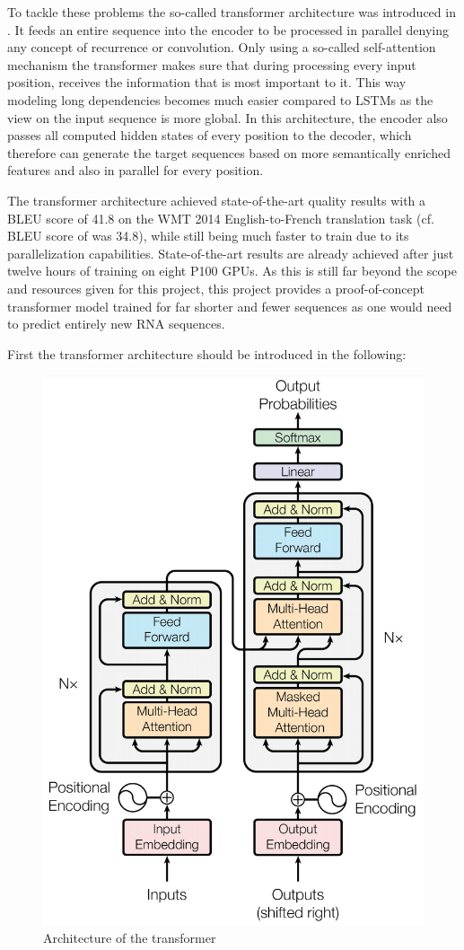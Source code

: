 To tackle these problems the so-called transformer architecture was in\-tro\-du\-ced in \cite{Vaswani2017}. It feeds an entire sequence into the encoder to be processed in parallel denying any concept of recurrence or convolution. Only using a so-called self-attention mechanism the transformer makes sure that during processing every input position, receives the information that is most im\-portant to it. This way modeling long dependencies becomes much easier compared to \acp{LSTM} as the view on the input sequence is more global. In this architecture, the encoder also passes all computed hidden states of every position to the decoder, which therefore can generate the target sequences based on more semantically enriched features and also in parallel for every position. \cite{Vaswani2017}

The transformer architecture achieved state-of-the-art quality results with a \ac{BLEU} score of 41.8 on the WMT 2014 English-to-French translation task (cf. \ac{BLEU} score of \cite{Sutskever2014} was 34.8), while still being much faster to train due to its parallelization capabilities. State-of-the-art results are already achieved after just twelve hours of training on eight P100 \acp{GPU}. As this is still far beyond the scope and resources given for this project, this project provides a proof-of-concept transformer model trained for far shorter and fewer sequences as one would need to predict entirely new \ac{RNA} sequences. \cite{Vaswani2017}

First the transformer architecture should be introduced in the following:

\begin{figure}[ht]
	\centering
	\includegraphics[width=0.5\linewidth]{figures/transformer.png}
	\caption{Architecture of the transformer \cite{Vaswani2017}}
	\label{transformer}
\end{figure}

